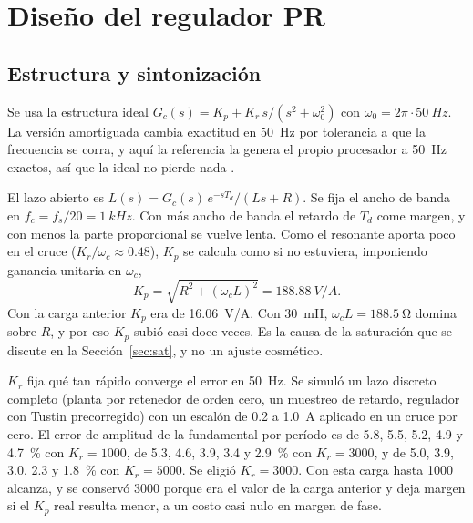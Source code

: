 \documentclass[journal]{IEEEtran}
\begin{document}
\section{Diseño del regulador PR}
\label{sec:pr}

\subsection{Estructura y sintonización}
\label{sec:estructura}
Se usa la estructura ideal $G_c(s)=K_p+K_r\,s/(s^2+\omega_0^2)$ con $\omega_0=2\pi\cdot\SI{50}{Hz}$. La versión amortiguada cambia exactitud en \SI{50}{Hz} por tolerancia a que la frecuencia se corra, y aquí la referencia la genera el propio procesador a \SI{50}{Hz} exactos, así que la ideal no pierde nada \cite{teodorescu2006}.

El lazo abierto es $L(s)=G_c(s)\,e^{-sT_d}/(Ls+R)$. Se fija el ancho de banda en $f_c=f_s/20=\SI{1}{kHz}$. Con más ancho de banda el retardo de $T_d$ come margen, y con menos la parte proporcional se vuelve lenta. Como el resonante aporta poco en el cruce ($K_r/\omega_c\approx0.48$), $K_p$ se calcula como si no estuviera, imponiendo ganancia unitaria en $\omega_c$,
\begin{equation}
	K_p=\sqrt{R^2+(\omega_cL)^2}=\SI{188.88}{V/A}.
	\label{eq:kp}
\end{equation}
Con la carga anterior $K_p$ era de \SI{16.06}{V/A}. Con \SI{30}{mH}, $\omega_cL=\SI{188.5}{\ohm}$ domina sobre $R$, y por eso $K_p$ subió casi doce veces. Es la causa de la saturación que se discute en la Sección~\ref{sec:sat}, y no un ajuste cosmético.

$K_r$ fija qué tan rápido converge el error en \SI{50}{Hz}. Se simuló un lazo discreto completo (planta por retenedor de orden cero, un muestreo de retardo, regulador con Tustin precorregido) con un escalón de \num{0.2} a \SI{1.0}{A} aplicado en un cruce por cero. El error de amplitud de la fundamental por período es de \num{5.8}, \num{5.5}, \num{5.2}, \num{4.9} y \SI{4.7}{\percent} con $K_r=1000$, de \num{5.3}, \num{4.6}, \num{3.9}, \num{3.4} y \SI{2.9}{\percent} con $K_r=3000$, y de \num{5.0}, \num{3.9}, \num{3.0}, \num{2.3} y \SI{1.8}{\percent} con $K_r=5000$. Se eligió $K_r=3000$. Con esta carga hasta \num{1000} alcanza, y se conservó \num{3000} porque era el valor de la carga anterior y deja margen si el $K_p$ real resulta menor, a un costo casi nulo en margen de fase.
\end{document}
